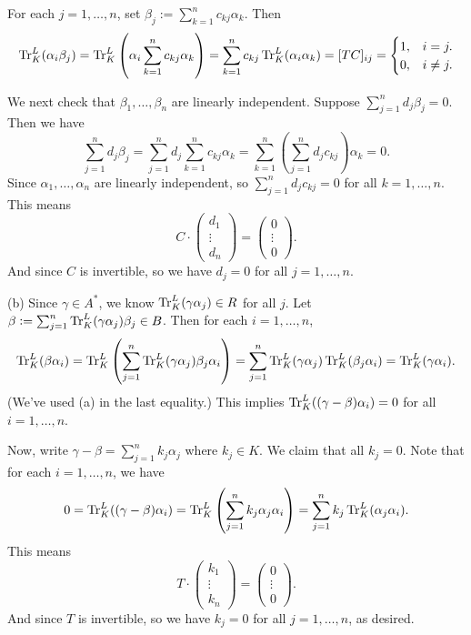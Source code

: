 \documentclass[../Marcus.tex]{subfiles}
\begin{document}
For each $j=1,\ldots,n$, set $\beta_j:=\sum_{k=1}^n c_{kj}\alpha_k$. Then
$$
	\operatorname{Tr}^L_K(\alpha_i\beta_j)
	= \operatorname{Tr}^L_K \left(\alpha_i \sum_{k=1}^n c_{kj}\alpha_k \right)
	= \sum_{k=1}^n c_{kj} \operatorname{Tr}^L_K(\alpha_i\alpha_k) = [TC]_{ij}
	= \begin{cases}
		1, & i=j. \\
		0, & i\neq j.
	  \end{cases}
$$

We next check that $\beta_1,\ldots,\beta_n$ are linearly independent. Suppose $\sum_{j=1}^n d_j\beta_j = 0$. Then we have
$$
\sum_{j=1}^n d_j\beta_j
= \sum_{j=1}^n d_j \sum_{k=1}^n c_{kj}\alpha_k
=  \sum_{k=1}^n \left( \sum_{j=1}^n d_j c_{kj} \right) \alpha_k
= 0.
$$
Since $\alpha_1,\ldots,\alpha_n$ are linearly independent, so $\sum_{j=1}^n d_j c_{kj} = 0$ for all $k=1,\ldots,n$. This means
$$
C \cdot
\begin{pmatrix}
    d_1 \\
    \vdots \\
    d_n
\end{pmatrix}
=
\begin{pmatrix}
    0 \\
    \vdots \\
    0
\end{pmatrix}.
$$
And since $C$ is invertible, so we have $d_j=0$ for all $j=1,\ldots,n$.

(b) Since $\gamma \in A^*$, we know $\operatorname{Tr}^L_K(\gamma\alpha_j) \in R$ for all $j$. Let $\beta:=\sum_{j=1}^n \operatorname{Tr}^L_K(\gamma\alpha_j)\beta_j \in B$. Then for each $i=1,\ldots,n$,
$$
\operatorname{Tr}^L_K(\beta\alpha_i)
= \operatorname{Tr}^L_K \left( \sum_{j=1}^n \operatorname{Tr}^L_K(\gamma\alpha_j) \beta_j \alpha_i \right)
= \sum_{j=1}^n \operatorname{Tr}^L_K(\gamma\alpha_j) \operatorname{Tr}^L_K(\beta_j \alpha_i )
= \operatorname{Tr}^L_K(\gamma\alpha_i).
$$
(We've used (a) in the last equality.) This implies $\operatorname{Tr}^L_K((\gamma-\beta)\alpha_i) = 0$ for all $i=1,\ldots,n$.

Now, write $\gamma-\beta = \sum_{j=1}^n k_j\alpha_j$ where $k_j\in K$. We claim that all $k_j=0$. Note that for each $i=1,\ldots,n$, we have
$$
0
= \operatorname{Tr}^L_K((\gamma-\beta)\alpha_i)
=  \operatorname{Tr}^L_K \left(\sum_{j=1}^n k_j\alpha_j \alpha_i\right)
= \sum_{j=1}^n k_j \operatorname{Tr}^L_K(\alpha_j\alpha_i).
$$
This means
$$
T \cdot
\begin{pmatrix}
    k_1 \\
    \vdots \\
    k_n
\end{pmatrix}
=
\begin{pmatrix}
    0 \\
    \vdots \\
    0
\end{pmatrix}.
$$
And since $T$ is invertible, so we have $k_j=0$ for all $j=1,\ldots,n$, as desired.
\end{document}
